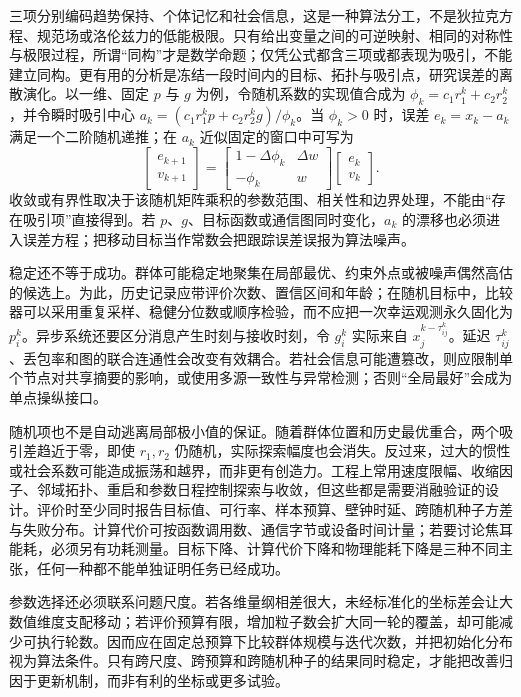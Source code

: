 三项分别编码趋势保持、个体记忆和社会信息，这是一种算法分工，不是狄拉克方程、规范场或洛伦兹力的低能极限。只有给出变量之间的可逆映射、相同的对称性与极限过程，所谓“同构”才是数学命题；仅凭公式都含三项或都表现为吸引，不能建立同构。更有用的分析是冻结一段时间内的目标、拓扑与吸引点，研究误差的离散演化。以一维、固定 $p$ 与 $g$ 为例，令随机系数的实现值合成为 $\phi_k=c_1r_1^k+c_2r_2^k$，并令瞬时吸引中心 $a_k=(c_1r_1^kp+c_2r_2^kg)/\phi_k$。当 $\phi_k>0$ 时，误差 $e_k=x_k-a_k$ 满足一个二阶随机递推；在 $a_k$ 近似固定的窗口中可写为
\[
\begin{bmatrix}e_{k+1}\\v_{k+1}\end{bmatrix}
=
\begin{bmatrix}1-\Delta\phi_k&\Delta w\\-\phi_k&w\end{bmatrix}
\begin{bmatrix}e_k\\v_k\end{bmatrix}.
\]
收敛或有界性取决于该随机矩阵乘积的参数范围、相关性和边界处理，不能由“存在吸引项”直接得到。若 $p$、$g$、目标函数或通信图同时变化，$a_k$ 的漂移也必须进入误差方程；把移动目标当作常数会把跟踪误差误报为算法噪声。

稳定还不等于成功。群体可能稳定地聚集在局部最优、约束外点或被噪声偶然高估的候选上。为此，历史记录应带评价次数、置信区间和年龄；在随机目标中，比较器可以采用重复采样、稳健分位数或顺序检验，而不应把一次幸运观测永久固化为 $p_i^k$。异步系统还要区分消息产生时刻与接收时刻，令 $g_i^k$ 实际来自 $x_j^{k-\tau_{ij}^k}$。延迟 $\tau_{ij}^k$、丢包率和图的联合连通性会改变有效耦合。若社会信息可能遭篡改，则应限制单个节点对共享摘要的影响，或使用多源一致性与异常检测；否则“全局最好”会成为单点操纵接口。

随机项也不是自动逃离局部极小值的保证。随着群体位置和历史最优重合，两个吸引差趋近于零，即使 $r_1,r_2$ 仍随机，实际探索幅度也会消失。反过来，过大的惯性或社会系数可能造成振荡和越界，而非更有创造力。工程上常用速度限幅、收缩因子、邻域拓扑、重启和参数日程控制探索与收敛，但这些都是需要消融验证的设计。评价时至少同时报告目标值、可行率、样本预算、壁钟时延、跨随机种子方差与失败分布。计算代价可按函数调用数、通信字节或设备时间计量；若要讨论焦耳能耗，必须另有功耗测量。目标下降、计算代价下降和物理能耗下降是三种不同主张，任何一种都不能单独证明任务已经成功。

参数选择还必须联系问题尺度。若各维量纲相差很大，未经标准化的坐标差会让大数值维度支配移动；若评价预算有限，增加粒子数会扩大同一轮的覆盖，却可能减少可执行轮数。因而应在固定总预算下比较群体规模与迭代次数，并把初始化分布视为算法条件。只有跨尺度、跨预算和跨随机种子的结果同时稳定，才能把改善归因于更新机制，而非有利的坐标或更多试验。

